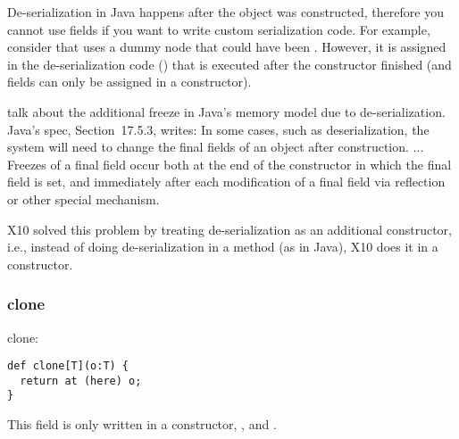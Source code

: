 De-serialization in Java happens after the object was constructed,
    therefore you cannot use  fields if you want to write custom serialization code.
For example, consider  that uses a dummy  node
    that could have been .
However, it is assigned in the de-serialization code ()
    that is executed after the constructor finished
    (and  fields can only be assigned in a constructor).

talk about the additional freeze in Java's memory model due to de-serialization.
Java's spec, Section~17.5.3, writes:
 In some cases, such as deserialization, the system will need to change the final fields of an object after construction.
 ...
 Freezes of a final field occur both at the end of the constructor in which the final field is set,
 and immediately after each modification of a final field via reflection or other special mechanism.

X10 solved this problem by treating de-serialization as an additional constructor,
    i.e., instead of doing de-serialization in a method (as in Java),
    X10 does it in a constructor.


\subsubsection{clone}
clone:
\begin{lstlisting}[texcl]
def clone[T](o:T) {
  return at (here) o;
}
\end{lstlisting}

This field is only written in a constructor, , and .







